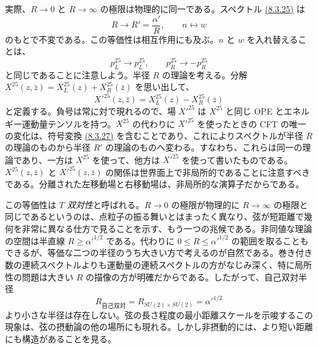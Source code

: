 実際、$R\to0$ と $R\to\infty$ の極限は物理的に同一である。スペクトル \hyperref[eq:8.3.25]{(8.3.25)} は
\begin{equation}
R\to R'=\frac{\alpha'}R,\qquad n\leftrightarrow w
\tag{8.3.26}\label{eq:8.3.26}
\end{equation}
のもとで不変である。この等価性は相互作用にも及ぶ。$n$ と $w$ を入れ替えることは、
\begin{equation}
p_L^{25}\to p_L^{25},\qquad p_R^{25}\to-p_R^{25}
\tag{8.3.27}\label{eq:8.3.27}
\end{equation}
と同じであることに注意しよう。半径 $R$ の理論を考える。分解 $X^{25}(z,\bar z)=X_L^{25}(z)+X_R^{25}(\bar z)$ を思い出して、
\begin{equation}
X'^{25}(z,\bar z)=X_L^{25}(z)-X_R^{25}(\bar z)
\tag{8.3.28}\label{eq:8.3.28}
\end{equation}
と定義する。負号は常に対で現れるので、場 $X'^{25}$ は $X^{25}$ と同じ OPE とエネルギー運動量テンソルを持つ。$X^{25}$ の代わりに $X'^{25}$ を使ったときの CFT の唯一の変化は、符号変換 \hyperref[eq:8.3.27]{(8.3.27)} を含むことであり、これによりスペクトルが半径 $R$ の理論のものから半径 $R'$ の理論のものへ変わる。すなわち、これらは同一の理論であり、一方は $X^{25}$ を使って、他方は $X'^{25}$ を使って書いたものである。$X^{25}(z,\bar z)$ と $X'^{25}(z,\bar z)$ の関係は世界面上で非局所的であることに注意すべきである。分離された左移動場と右移動場は、非局所的な演算子だからである。

この等価性は \emph{$T$ 双対性}と呼ばれる。$R\to0$ の極限が物理的に $R\to\infty$ の極限と同じであるというのは、点粒子の振る舞いとはまったく異なり、弦が短距離で幾何を非常に異なる仕方で見ることを示す、もう一つの兆候である。非同値な理論の空間は半直線 $R\geq\alpha'^{1/2}$ である。代わりに $0\leq R\leq\alpha'^{1/2}$ の範囲を取ることもできるが、等価な二つの半径のうち大きい方で考えるのが自然である。巻き付き数の連続スペクトルよりも運動量の連続スペクトルの方がなじみ深く、特に局所性の問題は大きい $R$ の描像の方が明確だからである。したがって、自己双対半径
\begin{equation}
R_{\text{自己双対}}=R_{SU(2)\times SU(2)}=\alpha'^{1/2}
\tag{8.3.29}\label{eq:8.3.29}
\end{equation}
より小さな半径は存在しない。弦の長さ程度の最小距離スケールを示唆するこの現象は、弦の摂動論の他の場所にも現れる。しかし非摂動的には、より短い距離にも構造があることを見る。

